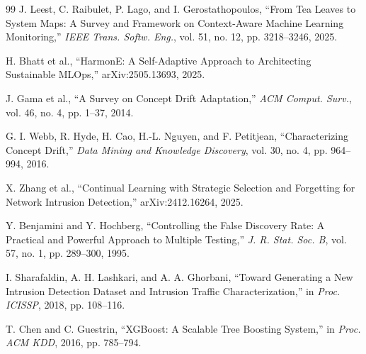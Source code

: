 \documentclass[runningheads]{llncs}
\begin{document}
\begin{thebibliography}{99}
J. Leest, C. Raibulet, P. Lago, and I. Gerostathopoulos, ``From Tea Leaves to System Maps: A Survey and Framework on Context-Aware Machine Learning Monitoring,'' \textit{IEEE Trans. Softw. Eng.}, vol. 51, no. 12, pp. 3218--3246, 2025.

H. Bhatt et al.,
``HarmonE: A Self-Adaptive Approach to Architecting Sustainable MLOps,''
arXiv:2505.13693, 2025.

J. Gama et al., ``A Survey on Concept Drift Adaptation,'' \textit{ACM Comput. Surv.}, vol. 46, no. 4, pp. 1--37, 2014.

G. I. Webb, R. Hyde, H. Cao, H.-L. Nguyen, and F. Petitjean,
``Characterizing Concept Drift,''
\textit{Data Mining and Knowledge Discovery}, vol. 30, no. 4,
pp. 964--994, 2016.

X. Zhang et al.,
``Continual Learning with Strategic Selection and Forgetting for Network Intrusion Detection,''
arXiv:2412.16264, 2025.

Y. Benjamini and Y. Hochberg, ``Controlling the False Discovery Rate: A Practical and Powerful Approach to Multiple Testing,'' \textit{J. R. Stat. Soc. B}, vol. 57, no. 1, pp. 289--300, 1995.

I. Sharafaldin, A. H. Lashkari, and A. A. Ghorbani, ``Toward Generating a New Intrusion Detection Dataset and Intrusion Traffic Characterization,'' in \textit{Proc. ICISSP}, 2018, pp. 108--116.

T. Chen and C. Guestrin, ``XGBoost: A Scalable Tree Boosting System,'' in \textit{Proc. ACM KDD}, 2016, pp. 785--794.

\end{thebibliography}
\end{document}
